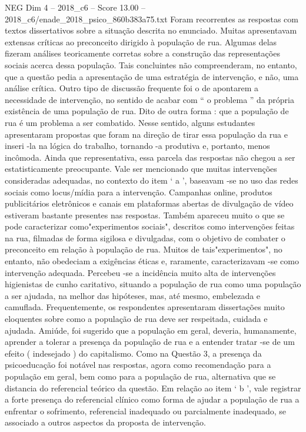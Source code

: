\begin{textsample}{NEG Dim 4 – 2018\_c6 – Score 13.00 – 2018\_c6/enade\_2018\_psico\_860b383a75.txt}
Foram recorrentes as respostas com textos dissertativos sobre a situação descrita no enunciado.
Muitas apresentavam extensas críticas ao preconceito dirigido à população de rua.
Algumas delas fizeram análises teoricamente corretas sobre a construção das representações sociais acerca dessa população.
Tais concluintes não compreenderam, no entanto, que a questão pedia a apresentação de uma estratégia de intervenção, e não, uma análise crítica.
Outro tipo de discussão frequente foi o de apontarem a necessidade de intervenção, no sentido de acabar com “ o problema ” da própria existência de uma população de rua.
Dito de outra forma : que a população de rua é um problema a ser combatido.
Nesse sentido, alguns estudantes apresentaram propostas que foram na direção de tirar essa população da rua e inseri -la na lógica do trabalho, tornando -a produtiva e, portanto, menos incômoda.
Ainda que representativa, essa parcela das respostas não chegou a ser estatisticamente preocupante.
Vale ser mencionado que muitas intervenções consideradas adequadas, no contexto do item ‘ a ’, baseavam -se no uso das redes sociais como locus/mídia para a intervenção.
Campanhas online, produtos publicitários eletrônicos e canais em plataformas abertas de divulgação de vídeo estiveram bastante presentes nas respostas.
Também apareceu muito o que se pode caracterizar como"experimentos sociais", descritos como intervenções feitas na rua, filmadas de forma sigilosa e divulgadas, com o objetivo de combater o preconceito em relação à população de rua.
Muitos de tais"experimentos", no entanto, não obedeciam a exigências éticas e, raramente, caracterizavam -se como intervenção adequada.
Percebeu -se a incidência muito alta de intervenções higienistas de cunho caritativo, situando a população de rua como uma população a ser ajudada, na melhor das hipóteses, mas, até mesmo, embelezada e camuflada.
Frequentemente, os respondentes apresentaram dissertações muito eloquentes sobre como a população de rua deve ser respeitada, cuidada e ajudada.
Amiúde, foi sugerido que a população em geral, deveria, humanamente, aprender a tolerar a presença da população de rua e a entender tratar -se de um efeito ( indesejado ) do capitalismo.
Como na Questão 3, a presença da psicoeducação foi notável nas respostas, agora como recomendação para a população em geral, bem como para a população de rua, alternativa que se distancia do referencial teórico da questão.
Em relação ao item ‘ b ’, vale registrar a forte presença do referencial clínico como forma de ajudar a população de rua a enfrentar o sofrimento, referencial inadequado ou parcialmente inadequado, se associado a outros aspectos da proposta de intervenção.

\end{textsample}
